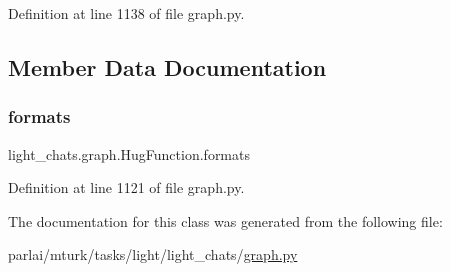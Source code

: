 Definition at line 1138 of file graph.\+py.



\subsection{Member Data Documentation}
\mbox{\label{classlight__chats_1_1graph_1_1HugFunction_a9671b61b4a4c5e2d97093da92ec4a431}} 
\subsubsection{\texorpdfstring{formats}{formats}}
{\footnotesize\ttfamily light\+\_\+chats.\+graph.\+Hug\+Function.\+formats}



Definition at line 1121 of file graph.\+py.



The documentation for this class was generated from the following file\+:\begin{DoxyCompactItemize}
\item 
parlai/mturk/tasks/light/light\+\_\+chats/\hyperlink{parlai_2mturk_2tasks_2light_2light__chats_2graph_8py}{graph.\+py}\end{DoxyCompactItemize}
